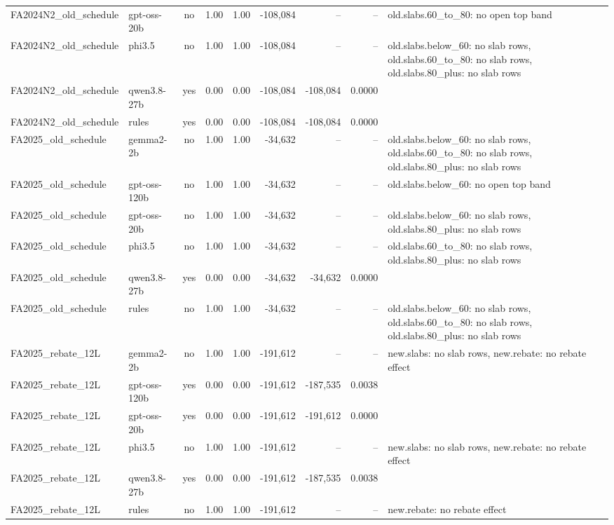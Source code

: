 \begin{table}[t]
\begin{tabular}{llcrrrrrl}
FA2024N2\_old\_schedule & gpt-oss-20b & no & 1.00 & 1.00 & -108,084 & -- & -- & old.slabs.60\_to\_80: no open top band \\
FA2024N2\_old\_schedule & phi3.5 & no & 1.00 & 1.00 & -108,084 & -- & -- & old.slabs.below\_60: no slab rows, old.slabs.60\_to\_80: no slab rows, old.slabs.80\_plus: no slab rows \\
FA2024N2\_old\_schedule & qwen3.8-27b & yes & 0.00 & 0.00 & -108,084 & -108,084 & 0.0000 &  \\
FA2024N2\_old\_schedule & rules & yes & 0.00 & 0.00 & -108,084 & -108,084 & 0.0000 &  \\
FA2025\_old\_schedule & gemma2-2b & no & 1.00 & 1.00 & -34,632 & -- & -- & old.slabs.below\_60: no slab rows, old.slabs.60\_to\_80: no slab rows, old.slabs.80\_plus: no slab rows \\
FA2025\_old\_schedule & gpt-oss-120b & no & 1.00 & 1.00 & -34,632 & -- & -- & old.slabs.below\_60: no open top band \\
FA2025\_old\_schedule & gpt-oss-20b & no & 1.00 & 1.00 & -34,632 & -- & -- & old.slabs.below\_60: no slab rows, old.slabs.80\_plus: no slab rows \\
FA2025\_old\_schedule & phi3.5 & no & 1.00 & 1.00 & -34,632 & -- & -- & old.slabs.60\_to\_80: no slab rows, old.slabs.80\_plus: no slab rows \\
FA2025\_old\_schedule & qwen3.8-27b & yes & 0.00 & 0.00 & -34,632 & -34,632 & 0.0000 &  \\
FA2025\_old\_schedule & rules & no & 1.00 & 1.00 & -34,632 & -- & -- & old.slabs.below\_60: no slab rows, old.slabs.60\_to\_80: no slab rows, old.slabs.80\_plus: no slab rows \\
FA2025\_rebate\_12L & gemma2-2b & no & 1.00 & 1.00 & -191,612 & -- & -- & new.slabs: no slab rows, new.rebate: no rebate effect \\
FA2025\_rebate\_12L & gpt-oss-120b & yes & 0.00 & 0.00 & -191,612 & -187,535 & 0.0038 &  \\
FA2025\_rebate\_12L & gpt-oss-20b & yes & 0.00 & 0.00 & -191,612 & -191,612 & 0.0000 &  \\
FA2025\_rebate\_12L & phi3.5 & no & 1.00 & 1.00 & -191,612 & -- & -- & new.slabs: no slab rows, new.rebate: no rebate effect \\
FA2025\_rebate\_12L & qwen3.8-27b & yes & 0.00 & 0.00 & -191,612 & -187,535 & 0.0038 &  \\
FA2025\_rebate\_12L & rules & no & 1.00 & 1.00 & -191,612 & -- & -- & new.rebate: no rebate effect \\

\end{tabular}
\end{table}
